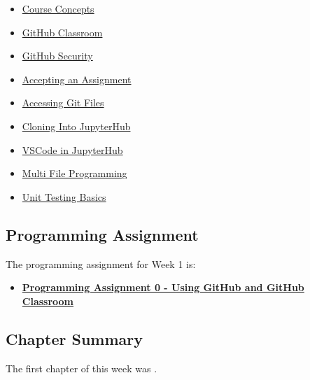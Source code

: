 \begin{itemize}
    \item \href{https://www.youtube.com/watch?v=l3e6UsF1RdQ}{Course Concepts}
    \item \href{https://www.youtube.com/watch?v=hu81oFq0nA8}{GitHub Classroom}
    \item \href{https://www.youtube.com/watch?v=7_x86HeoglQ&t=178s}{GitHub Security}
    \item \href{https://www.youtube.com/watch?v=b0Ystl84XYY}{Accepting an Assignment}
    \item \href{https://applied.cs.colorado.edu/mod/page/view.php?id=45856}{Accessing Git Files}
    \item \href{https://www.youtube.com/watch?v=M293X5ssks4}{Cloning Into JupyterHub}
    \item \href{https://www.youtube.com/watch?v=dptdfci_Zn0}{VSCode in JupyterHub}
    \item \href{https://www.youtube.com/watch?v=jchWSvAdadE}{Multi File Programming}
    \item \href{https://www.youtube.com/watch?v=tsVh8mG2tM0}{Unit Testing Basics}
\end{itemize}

\subsection{Programming Assignment}

The programming assignment for Week 1 is:

\begin{itemize}
    \item \href{https://github.com/QuantumCompiler/CU/tree/main/CSPB%202270%20-%20Data%20Structures/CSPB%202270%20-%20Programming%20Assignments/CSPB%202270%20-%20Assignment%200%20-%20GitHub}{\textbf{Programming Assignment 0 - Using GitHub and GitHub Classroom}}
\end{itemize}

\subsection{Chapter Summary}

The first chapter of this week was .

